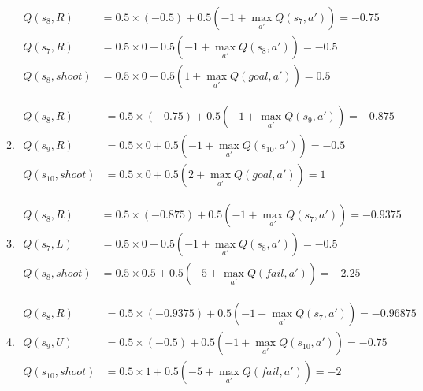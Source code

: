 \begin{enumerate}
\begin{enumerate}
\begin{align*}
            Q(s_8, R) &= 0.5 \times (-0.5) + 0.5 (-1 + \max_{a'} Q(s_7, a')) = -0.75\\
            Q(s_7, R) &= 0.5 \times 0 + 0.5 (-1 + \max_{a'} Q(s_8, a')) = -0.5\\
            Q(s_8, shoot) &= 0.5 \times 0 + 0.5 (1 + \max_{a'} Q(goal, a')) = 0.5
        \end{align*}
        \item \begin{align*}
            Q(s_8, R) &= 0.5 \times (-0.75) + 0.5 (-1 + \max_{a'} Q(s_9, a')) = −0.875\\
            Q(s_9, R) &= 0.5 \times 0 + 0.5 (-1 + \max_{a'} Q(s_{10}, a')) = -0.5\\
            Q(s_{10}, shoot) &= 0.5 \times 0 + 0.5 (2 + \max_{a'} Q(goal, a')) = 1
        \end{align*}
        \item \begin{align*}
            Q(s_8, R) &= 0.5 \times (−0.875) + 0.5 (-1 + \max_{a'} Q(s_7, a')) = −0.9375\\
            Q(s_7, L) &= 0.5 \times 0 + 0.5 (-1 + \max_{a'} Q(s_8, a')) = -0.5\\
            Q(s_8, shoot) &= 0.5 \times 0.5 + 0.5 (-5 + \max_{a'} Q(fail, a')) = -2.25
        \end{align*}
        \item \begin{align*}
            Q(s_8, R) &= 0.5 \times (−0.9375) + 0.5 (-1 + \max_{a'} Q(s_7, a')) = −0.96875\\
            Q(s_9, U) &= 0.5 \times (-0.5) + 0.5 (-1 + \max_{a'} Q(s_{10}, a')) = −0.75\\
            Q(s_{10}, shoot) &= 0.5 \times 1 + 0.5 (-5 + \max_{a'} Q(fail, a')) = -2
        \end{align*}
    \end{enumerate}
\end{enumerate}








